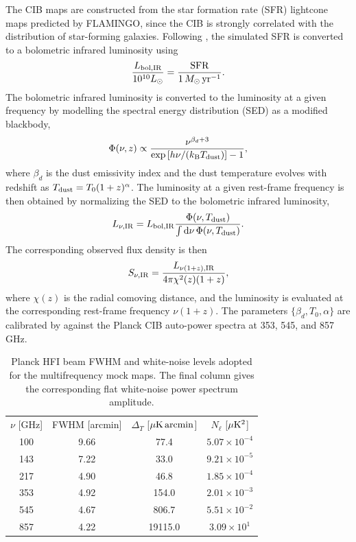 \documentclass[aps,prd,twocolumn,superscriptaddress,nofootinbib,floatfix]{revtex4-2}
\begin{document}
The CIB maps are constructed from the star formation rate (SFR) lightcone maps predicted by FLAMINGO, since the CIB is strongly correlated with the distribution of star-forming galaxies. Following \citet{Yang:2025per},
the simulated SFR is converted to a bolometric infrared luminosity using
\begin{equation}
\frac{L_{\rm bol,IR}}{10^{10}L_\odot}
=
\frac{\mathrm{SFR}}
{1\,M_\odot\,\mathrm{yr}^{-1}}.
\label{eq:flamingo_cib_sfr}
\end{equation}
The bolometric infrared luminosity is converted to the luminosity at a given frequency by modelling the spectral energy distribution (SED) as a modified blackbody,
\begin{equation}
\Phi(\nu,z)
\propto
\frac{\nu^{\beta_d+3}}
{\exp\left[
h\nu/(k_{\rm B}T_{\rm dust})
\right]-1},
\label{eq:flamingo_cib_sed}
\end{equation}
where $\beta_d$ is the dust emissivity index and the dust temperature
evolves with redshift as $T_{\rm dust}=T_0(1+z)^\alpha$. The luminosity at a given rest-frame frequency is then obtained by
normalizing the SED to the bolometric infrared luminosity,
\begin{equation}
L_{\nu,{\rm IR}}
=
L_{\rm bol,IR}
\frac{\Phi(\nu,T_{\rm dust})}
{\int \mathrm{d}\nu\,\Phi(\nu,T_{\rm dust})}.
\label{eq:flamingo_cib_lnu}
\end{equation}
The corresponding observed flux density is then
\begin{equation}
S_{\nu,{\rm IR}}
=
\frac{
L_{\nu(1+z),{\rm IR}}
}{
4\pi \chi^2(z)(1+z)
},
\label{eq:flamingo_cib_flux}
\end{equation}
where $\chi(z)$ is the radial comoving distance, and the luminosity is
evaluated at the corresponding rest-frame frequency $\nu(1+z)$. The parameters
$\{\beta_d,T_0,\alpha\}$ are calibrated by \citet{Yang:2025per} against
the Planck CIB auto-power spectra at 353, 545, and 857 GHz.

\begin{table}[t]
\centering
\caption{Planck HFI beam FWHM and white-noise levels adopted for the
multifrequency mock maps. The final column gives the corresponding flat
white-noise power spectrum amplitude.}
\label{tab:planck_mock_properties}
\begin{ruledtabular}
\begin{tabular}{cccc}
$\nu$ [GHz]
& FWHM [arcmin]
& $\Delta_T$ [$\mu{\rm K\,arcmin}$]
& $N_\ell$ [$\mu{\rm K}^2$] \\
100 & 9.66 & 77.4    & $5.07\times10^{-4}$ \\
143 & 7.22 & 33.0    & $9.21\times10^{-5}$ \\
217 & 4.90 & 46.8    & $1.85\times10^{-4}$ \\
353 & 4.92 & 154.0   & $2.01\times10^{-3}$ \\
545 & 4.67 & 806.7   & $5.51\times10^{-2}$ \\
857 & 4.22 & 19115.0 & $3.09\times10^{1}$ \\
\end{tabular}
\end{ruledtabular}
\end{table}
\end{document}
